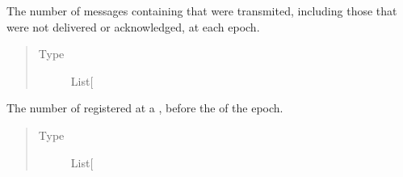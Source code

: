 \documentclass[letterpaper,10pt,english]{sphinxmanual}
\begin{document}
\begin{fulllineitems}
\begin{fulllineitems}
\label{\detokenize{app.domain.helpers:app.domain.helpers.smart_dataclasses.LoggingData.blocks_moved}}
The number of messages containing {\hyperref[\detokenize{app.domain.helpers:app.domain.helpers.smart_dataclasses.FileBlockData}]{}} that were
transmited, including those that were not delivered or
acknowledged, at each epoch.
\begin{quote}\begin{description}
\item[{Type}] \leavevmode
List{[}\sphinxhref{https://docs.python.org/3.7/library/functions.html\#int}{int}{]}

\end{description}\end{quote}

\end{fulllineitems}


\begin{fulllineitems}
\label{\detokenize{app.domain.helpers:app.domain.helpers.smart_dataclasses.LoggingData.cluster_size_bm}}
The number of {\hyperref[\detokenize{app.domain:module-app.domain.network_nodes}]{}}
registered at a  {\hyperref[\detokenize{app.domain:app.domain.cluster_groups.Cluster.members}]{}},
before the {\hyperref[\detokenize{app.domain:app.domain.cluster_groups.Cluster.membership_maintenance}]{}}
of the epoch.
\begin{quote}\begin{description}
\item[{Type}] \leavevmode
List{[}\sphinxhref{https://docs.python.org/3.7/library/functions.html\#int}{int}{]}

\end{description}\end{quote}

\end{fulllineitems}



\end{fulllineitems}
\end{document}
